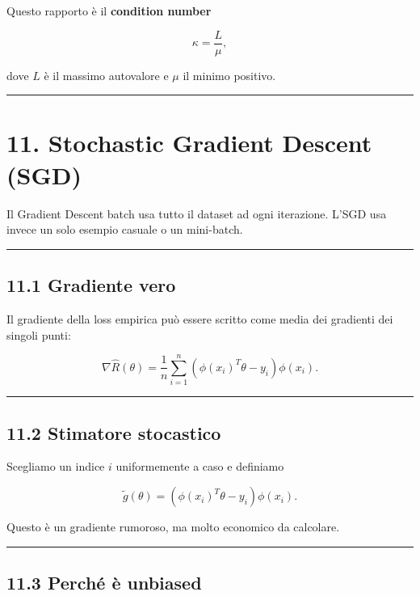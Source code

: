 \documentclass[
]{article}
\begin{document}
Questo rapporto è il \textbf{condition number}

\[
\kappa = \frac{L}{\mu},
\]

dove \(L\) è il massimo autovalore e \(\mu\) il minimo positivo.

\begin{center}\rule{0.5\linewidth}{0.5pt}\end{center}

\section{11. Stochastic Gradient Descent
(SGD)}\label{stochastic-gradient-descent-sgd}

Il Gradient Descent batch usa tutto il dataset ad ogni iterazione. L'SGD
usa invece un solo esempio casuale o un mini-batch.

\begin{center}\rule{0.5\linewidth}{0.5pt}\end{center}

\subsection{11.1 Gradiente vero}\label{gradiente-vero}

Il gradiente della loss empirica può essere scritto come media dei
gradienti dei singoli punti:

\[
\nabla \hat R(\theta)
=
\frac{1}{n}\sum_{i=1}^n (\phi(x_i)^T\theta - y_i)\phi(x_i).
\]

\begin{center}\rule{0.5\linewidth}{0.5pt}\end{center}

\subsection{11.2 Stimatore stocastico}\label{stimatore-stocastico}

Scegliamo un indice \(i\) uniformemente a caso e definiamo

\[
\tilde g(\theta)
=
(\phi(x_i)^T\theta-y_i)\phi(x_i).
\]

Questo è un gradiente rumoroso, ma molto economico da calcolare.

\begin{center}\rule{0.5\linewidth}{0.5pt}\end{center}

\subsection{11.3 Perché è unbiased}\label{perchuxe9-uxe8-unbiased}
\end{document}

